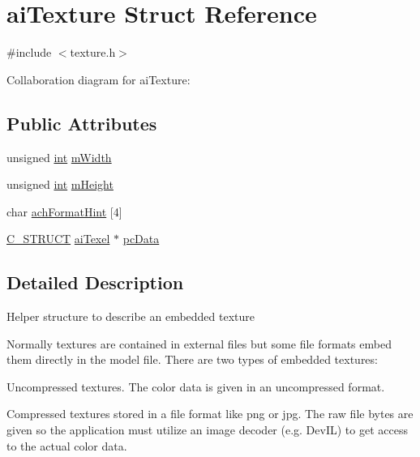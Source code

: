 \hypertarget{structai_texture}{\section{ai\-Texture Struct Reference}
\label{structai_texture}
}


{\ttfamily \#include $<$texture.\-h$>$}



Collaboration diagram for ai\-Texture\-:
\subsection*{Public Attributes}
\begin{DoxyCompactItemize}
\item 
unsigned \hyperlink{_s_d_l__thread_8h_a6a64f9be4433e4de6e2f2f548cf3c08e}{int} \hyperlink{structai_texture_aaa3ad8cfe44fdc4dea2db91977d92234}{m\-Width}
\item 
unsigned \hyperlink{_s_d_l__thread_8h_a6a64f9be4433e4de6e2f2f548cf3c08e}{int} \hyperlink{structai_texture_ac1e2fa6f1f646e9c55e3985d4418a752}{m\-Height}
\item 
char \hyperlink{structai_texture_aa9f44996acf3b301bfeb4e5348311540}{ach\-Format\-Hint} \mbox{[}4\mbox{]}
\item 
\hyperlink{defs_8h_ab51df4230ceb602bbc1bc109c432a6a0}{C\-\_\-\-S\-T\-R\-U\-C\-T} \hyperlink{structai_texel}{ai\-Texel} $\ast$ \hyperlink{structai_texture_aeb07528748b6e49d2d81c60006024f9a}{pc\-Data}
\end{DoxyCompactItemize}


\subsection{Detailed Description}
Helper structure to describe an embedded texture

Normally textures are contained in external files but some file formats embed them directly in the model file. There are two types of embedded textures\-:
\begin{DoxyEnumerate}
\item Uncompressed textures. The color data is given in an uncompressed format.
\item Compressed textures stored in a file format like png or jpg. The raw file bytes are given so the application must utilize an image decoder (e.\-g. Dev\-I\-L) to get access to the actual color data. 
\end{DoxyEnumerate}

